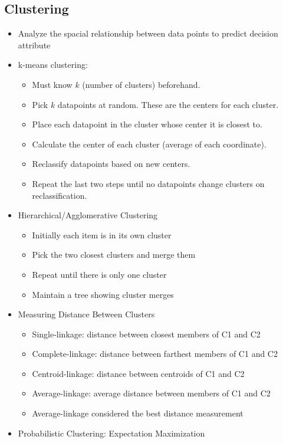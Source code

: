 \documentclass{article}
\begin{document}
\subsection{Clustering}
\begin{itemize}
	\item Analyze the spacial relationship between data points to predict decision attribute
	\item k-means clustering:
		\begin{itemize}
			\item Must know $k$ (number of clusters) beforehand.
			\item Pick $k$ datapoints at random. These are the centers for each cluster. 
			\item Place each datapoint in the cluster whose center it is closest to.
			\item Calculate the center of each cluster (average of each coordinate).
			\item Reclassify datapoints based on new centers.
			\item Repeat the last two steps until no datapoints change clusters on reclassification.
		\end{itemize}
	\item Hierarchical/Agglomerative Clustering
		\begin{itemize}
			\item Initially each item is in its own cluster
			\item Pick the two closest clusters and merge them 
			\item Repeat until there is only one cluster
			\item Maintain a tree showing cluster merges
		\end{itemize}
	\item Measuring Distance Between Clusters
		\begin{itemize}
			\item Single-linkage: distance between closest members of C1 and C2
			\item Complete-linkage: distance between farthest members of C1 and C2
			\item Centroid-linkage: distance between centroids of C1 and C2
			\item Average-linkage: average distance between members of C1 and C2
			\item Average-linkage considered the best distance measurement
		\end{itemize}
	\item Probabilistic Clustering: Expectation Maximization

\end{itemize}
\end{document}
